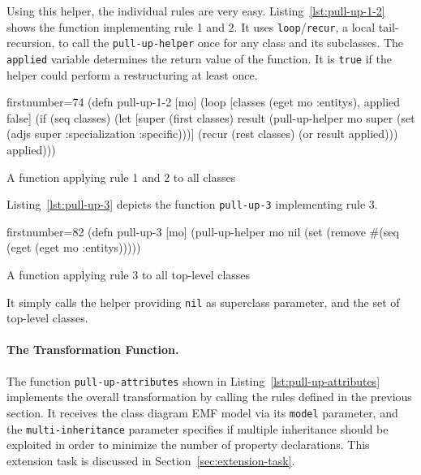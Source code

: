 \documentclass[submission]{eptcs}
\begin{document}
Using this helper, the individual rules are very easy.
Listing~\ref{lst:pull-up-1-2} shows the function implementing rule 1 and 2.  It
uses \verb|loop|/\verb|recur|, a local tail-recursion, to call the
\verb|pull-up-helper| once for any class and its subclasses.  The
\verb|applied| variable determines the return value of the function.  It is
\verb|true| if the helper could perform a restructuring at least once.


\begin{listing}[htbp]
  \begin{clojurecode*}{firstnumber=74}
(defn pull-up-1-2 [mo]
  (loop [classes (eget mo :entitys), applied false]
    (if (seq classes)
      (let [super (first classes)
            result (pull-up-helper
                    mo super (set (adjs super :specialization :specific)))]
        (recur (rest classes) (or result applied)))
      applied)))
  \end{clojurecode*}
  \caption{A function applying rule 1 and 2 to all classes}
    \label{lst:pull-up-1-2}
\end{listing}

Listing~\ref{lst:pull-up-3} depicts the function \verb|pull-up-3| implementing
rule 3.

\begin{listing}[htbp]
  \begin{clojurecode*}{firstnumber=82}
(defn pull-up-3 [mo]
  (pull-up-helper mo nil (set (remove #(seq (eget %
                                      (eget mo :entitys)))))
  \end{clojurecode*}
  \caption{A function applying rule 3 to all top-level classes}
    \label{lst:pull-up-3}
\end{listing}

It simply calls the helper providing \verb|nil| as superclass parameter, and
the set of top-level classes.


\paragraph{The Transformation Function.}

The function \verb|pull-up-attributes| shown in
Listing~\ref{lst:pull-up-attributes} implements the overall transformation by
calling the rules defined in the previous section.  It receives the class
diagram EMF model via its \verb|model| parameter, and the
\verb|multi-inheritance| parameter specifies if multiple inheritance should be
exploited in order to minimize the number of property declarations.  This
extension task is discussed in Section~\ref{sec:extension-task}.
\end{document}
